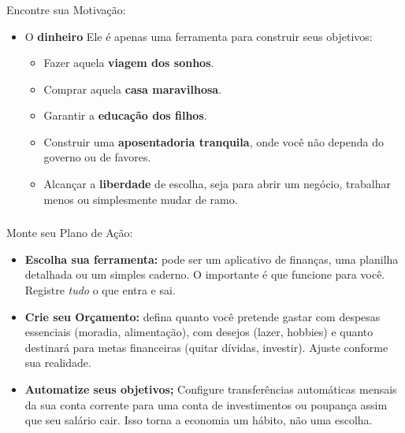 \begin{frame}[c]\frametitle{}

  \begin{block}{\Large \textcolor{blue}{}\quad Encontre sua Motivação:}

    \vspace{0.7cm}\pause

    \begin{itemize}
      \item O \textbf{dinheiro} Ele é apenas uma ferramenta para construir seus objetivos:
            \begin{itemize}
              \item Fazer aquela \textbf{viagem dos sonhos}.
              \item Comprar aquela \textbf{casa maravilhosa}.
              \item Garantir a \textbf{educação dos filhos}.
              \item Construir uma \textbf{aposentadoria tranquila}, onde você não dependa do governo ou de favores.
              \item Alcançar a \textbf{liberdade} de escolha, seja para abrir um negócio, trabalhar menos ou simplesmente mudar de ramo.
            \end{itemize}
    \end{itemize}
  \end{block}
\end{frame}

\begin{frame}[c]\frametitle{}
  \begin{block}{\Large \textcolor{green}{}\quad Monte seu Plano de Ação:}

    \vspace{0.7cm}\pause

    \begin{itemize}
      \item \textbf{Escolha sua ferramenta:} pode ser um aplicativo de finanças, uma planilha detalhada ou um simples caderno. O importante é que funcione para você. Registre \textit{tudo} o que entra e sai.
      \item \textbf{Crie seu Orçamento:} defina quanto você pretende gastar com despesas essenciais (moradia, alimentação), com  desejos (lazer, hobbies) e quanto destinará para metas financeiras (quitar dívidas, investir). Ajuste conforme sua realidade.
      \item \textbf{Automatize seus objetivos;} Configure transferências automáticas mensais da sua conta corrente para uma conta de investimentos ou poupança assim que seu salário cair. Isso torna a economia um hábito, não uma escolha.
    \end{itemize}
  \end{block}
\end{frame}

